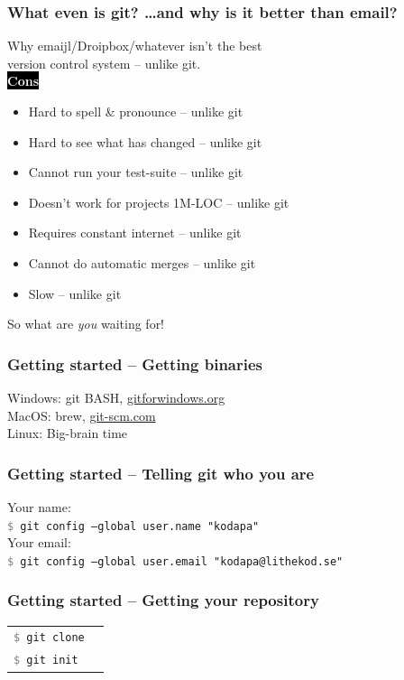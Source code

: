 \documentclass{beamer}
\newcommand{\keyword}[1]{\hspace{-1.0em}\colorbox{black}{\textcolor{white}{\textbf{#1}\vphantom{Ep}}}\vspace{0.2em}} %
\newcommand{\command}[1]{\texttt{\textcolor{gray}{\$} {#1}}}
\begin{document}
\begin{frame}[fragile]
  \frametitle{What even is git? \dots and why is it better than email?}

  Why emaijl/Droipbox/whatever isn't the best \\
  version control system -- unlike git.
  \vspace{1em} \\
  \keyword{Cons}
  \begin{itemize}[<+->]
    \item Hard to spell & pronounce -- unlike git
    \item Hard to see what has changed -- unlike git
    \item Cannot run your test-suite  -- unlike git
    \item Doesn't work for projects 1M-LOC -- unlike git
    \item Requires constant internet -- unlike git
    \item Cannot do automatic merges  -- unlike git
    \item Slow -- unlike git
  \end{itemize}
  \vspace{1em}
  
  So what are \emph{you} waiting for!
\end{frame}

\begin{frame}[fragile]
  \frametitle{Getting started -- Getting binaries}
  
  Windows: git BASH, \url{gitforwindows.org}\\
  MacOS: brew, \url{git-scm.com}\\
  Linux: Big-brain time\\

\end{frame}

\begin{frame}[fragile]
  \frametitle{Getting started -- Telling git who you are}

  Your name:\\
  \command{git config --global user.name "kodapa"} \\[1em]

  Your email:\\
  \command{git config --global user.email "kodapa@lithekod.se"} \\

\end{frame}

\begin{frame}[fragile]
  \frametitle{Getting started -- Getting your repository}
  \begin{tabular}{ll}
    \command{git clone} & \\
    \command{git init} & \\
  \end{tabular}
\end{frame}
\end{document}

